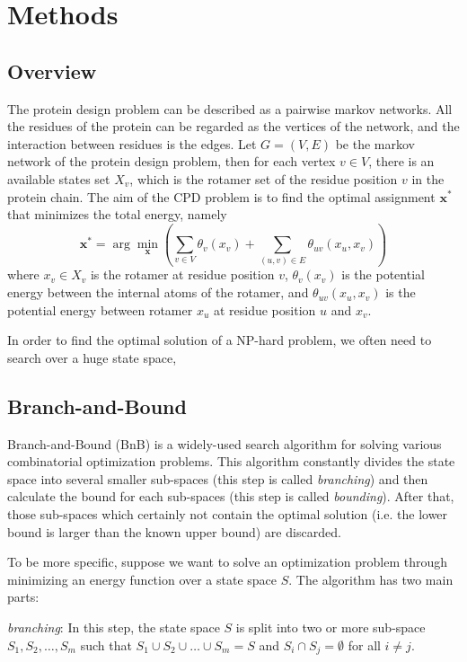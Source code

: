 \section{Methods}
\subsection{Overview}
The protein design problem can be described as a pairwise markov networks. All the residues of the protein can be regarded as the vertices of the network, and the interaction between residues is the edges. Let $G=(V,E)$ be the markov network of the protein design problem, then for each vertex $v\in V$, there is an available states set $X_v$, which is the rotamer set of the residue position $v$ in the protein chain. The aim of the CPD problem is to find the optimal assignment $\mathbf{x^*}$ that minimizes the total energy, namely
\[ \mathbf{x^*} = \arg\min_{\mathbf{x}}\left(\sum_{v\in V}\theta_v(x_v) + \sum_{(u,v)\in E}\theta_{uv}(x_u,x_v)\right) \]
where $x_v\in X_v$ is the rotamer at residue position $v$, $\theta_v(x_v)$ is the potential energy between the internal atoms of the rotamer, and $\theta_{uv}(x_u,x_v)$ is the potential energy between rotamer $x_u$ at residue position $u$ and $x_v$.

In order to find the optimal solution of a NP-hard problem, we often need to search over a huge state space, 

\subsection{Branch-and-Bound}
Branch-and-Bound (BnB) is a widely-used search algorithm for solving various combinatorial optimization problems. This algorithm constantly divides the state space into several smaller sub-spaces (this step is called \textit{branching}) and then calculate the bound for each sub-spaces (this step is called \textit{bounding}). After that, those sub-spaces which certainly not contain the optimal solution (i.e. the lower bound is larger than the known upper bound) are discarded. 

To be more specific, suppose we want to solve an optimization problem through minimizing an energy function over a state space $S$. The algorithm has two main parts:

\noindent \textit{branching}: In this step, the state space $S$ is split into two or more sub-space $S_1,S_2,\dots,S_m$ such that $S_1\cup S_2\cup\dots\cup S_m=S$ and $S_i\cap S_j=\emptyset$ for all $i\neq j$.

